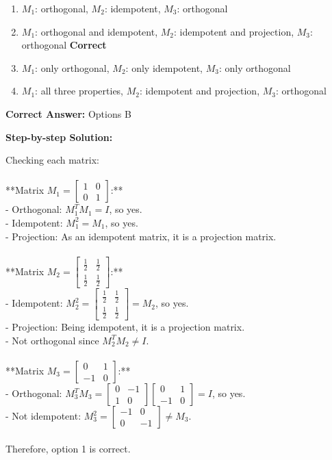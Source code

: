 \documentclass[11pt]{article}
\begin{document}
\begin{enumerate}[label=\textbf{\Alph*.}, leftmargin=1.8em]
\item \(M_1\): orthogonal, \(M_2\): idempotent, \(M_3\): orthogonal\item \(M_1\): orthogonal and idempotent, \(M_2\): idempotent and projection, \(M_3\): orthogonal \hfill {\color{gategreen}\textbf{Correct}}\item \(M_1\): only orthogonal, \(M_2\): only idempotent, \(M_3\): only orthogonal\item \(M_1\): all three properties, \(M_2\): idempotent and projection, \(M_3\): orthogonal\end{enumerate}

\textbf{Correct Answer:} Options B

\textbf{Step-by-step Solution:}

Checking each matrix:\\
\\
**Matrix \(M_1 = \begin{bmatrix} 1 & 0 \\ 0 & 1 \end{bmatrix}\):**\\
- Orthogonal: \(M_1^T M_1 = I\), so yes.\\
- Idempotent: \(M_1^2 = M_1\), so yes.\\
- Projection: As an idempotent matrix, it is a projection matrix.\\
\\
**Matrix \(M_2 = \begin{bmatrix} \frac{1}{2} & \frac{1}{2} \\ \frac{1}{2} & \frac{1}{2} \end{bmatrix}\):**\\
- Idempotent: \(M_2^2 = \begin{bmatrix} \frac{1}{2} & \frac{1}{2} \\ \frac{1}{2} & \frac{1}{2} \end{bmatrix} = M_2\), so yes.\\
- Projection: Being idempotent, it is a projection matrix.\\
- Not orthogonal since \(M_2^T M_2 \neq I\).\\
\\
**Matrix \(M_3 = \begin{bmatrix} 0 & 1 \\ -1 & 0 \end{bmatrix}\):**\\
- Orthogonal: \(M_3^T M_3 = \begin{bmatrix} 0 & -1 \\ 1 & 0 \end{bmatrix}\begin{bmatrix} 0 & 1 \\ -1 & 0 \end{bmatrix} = I\), so yes.\\
- Not idempotent: \(M_3^2 = \begin{bmatrix} -1 & 0 \\ 0 & -1 \end{bmatrix} \neq M_3\).\\
\\
Therefore, option 1 is correct.
\end{document}
